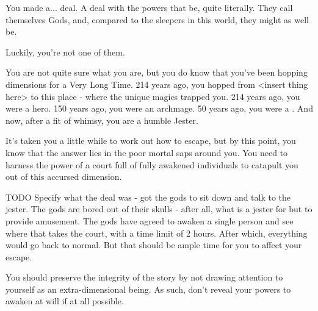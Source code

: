 \documentclass[char]{Emperia}
\begin{document}
\name{\cJester{}}

You made a... deal. A deal with the powers that be, quite literally. They call themselves Gods, and, compared to the sleepers in this world, they might as well be. 

Luckily, you're not one of them.

You are not quite sure what you are, but you do know that you've been hopping dimensions for a Very Long Time. 214 years ago, you hopped from <insert thing here> to this place - where the unique magics trapped you. 214 years ago, you were a hero. 150 years ago, you were an archmage. 50 years ago, you were a \monarch{}. And now, after a fit of whimsy, you are a humble Jester. 

It's taken you a little while to work out how to escape, but by this point, you know that the answer lies in the poor mortal saps around you. You need to harness the power of a court full of fully awakened individuals to catapult you out of this accursed dimension.



TODO
Specify what the deal was - got the gods to sit down and talk to the jester. The gods are bored out of their skulls - after all, what is a jester for but to provide amusement. The gods have agreed to awaken a single person and see where that takes the court, with a time limit of 2 hours. After which, everything would go back to normal. But that should be ample time for you to affect your escape.


You should preserve the integrity of the story by not drawing attention to yourself as an extra-dimensional being. As such, don't reveal your powers to awaken at will if at all possible.
\end{document}
